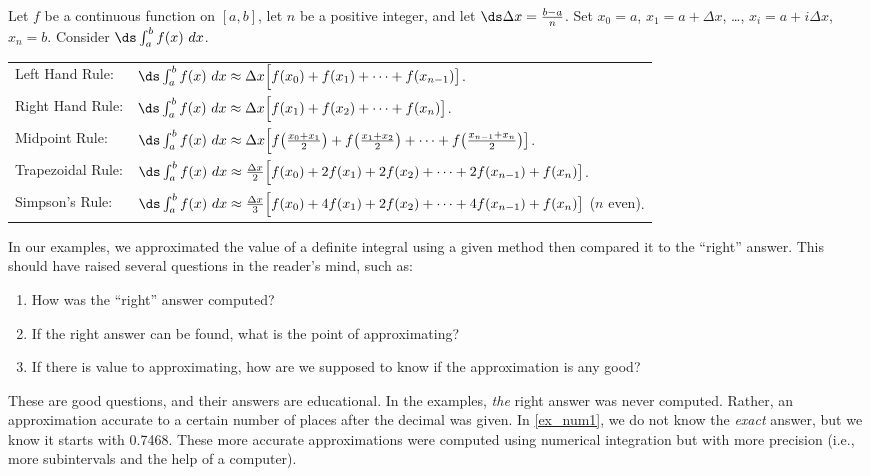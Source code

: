 \setboxwidth{140pt}%
{Let $f$ be a continuous function on $[a,b]$, let $n$ be a positive integer, and let $\ds\Delta x = \frac{b-a}{n}$.
Set $x_0=a$, $x_1=a+\Delta x$, \dots, $x_i = a+i\Delta x$, $x_n=b$.
Consider $\ds\int_a^b f(x)\ dx$.\\
\begin{tabular}{ll}
Left Hand Rule: &
$\ds\int_a^b f(x)\ dx \approx \Delta x\Big[f(x_0) + f(x_1) + \dotsb + f(x_{n-1})\big]$.\\
Right Hand Rule: &
$\ds\int_a^b f(x)\ dx \approx \Delta x\Big[f(x_1) + f(x_2) + \dotsb + f(x_n)\big]$.\\
Midpoint Rule: &
$\ds\int_a^b f(x)\ dx \approx \Delta x\Big[f\big(\frac{x_0+x_1}2\big) + f\big(\frac{x_1+x_2}2\big) + \dotsb + f\big(\frac{x_{n-1}+x_n}2\big)\big]$.\\
Trapezoidal Rule: &
$\ds\int_a^b f(x)\ dx \approx \frac{\Delta x}2\Big[f(x_0) + 2f(x_1) + 2f(x_2) +\dotsb + 2f(x_{n-1})+ f(x_n)\big]$.\\
Simpson's Rule: &
$\ds\int_a^b f(x)\ dx \approx \frac{\Delta x}3\Big[f(x_0) + 4f(x_1) + 2f(x_2) +\dotsb + 4f(x_{n-1})+ f(x_n)\big]$ {\small ($n$ even)}.
\end{tabular}}

In our examples, we approximated the value of a definite integral using a given method then compared it to the ``right'' answer. This should have raised several questions in the reader's mind, such as:
\begin{enumerate}
	\item	How was the ``right'' answer computed?
	\item	If the right answer can be found, what is the point of approximating?
	\item	If there is value to approximating, how are we supposed to know if the approximation is any good?
\end{enumerate}

These are good questions, and their answers are educational. In the examples, \textit{the} right answer was never computed. Rather, an approximation accurate to a certain number of places after the decimal was given. In \autoref{ex_num1}, we do not know the \textit{exact} answer, but we know it starts with 0.7468. These more accurate approximations were computed using numerical integration but with more precision (i.e., more subintervals and the help of a computer). 

